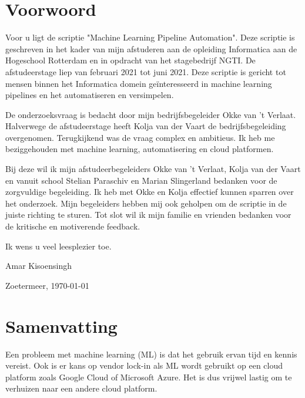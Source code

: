 \titleformat{\chapter}{\vspace{-1in}}{}{}{\Huge\textbf}
\section*{Voorwoord}\thispagestyle{fancy}
Voor u ligt de scriptie "Machine Learning Pipeline Automation". Deze scriptie is geschreven in het kader van mijn afstuderen aan de opleiding Informatica aan de Hogeschool Rotterdam en in opdracht van het stagebedrijf NGTI. De afstudeerstage liep van februari 2021 tot juni 2021. Deze scriptie is gericht tot mensen binnen het Informatica domein geïnteresseerd in machine learning pipelines en het automatiseren en versimpelen.

De onderzoeksvraag is bedacht door mijn bedrijfsbegeleider Okke van 't Verlaat. Halverwege de afstudeerstage heeft Kolja van der Vaart de bedrijfsbegeleiding overgenomen. Terugkijkend was de vraag complex en ambitieus. Ik heb me beziggehouden met machine learning, automatisering en cloud platformen. 

Bij deze wil ik mijn afstudeerbegeleiders Okke van 't Verlaat, Kolja van der Vaart en vanuit school Stelian Paraschiv en Marian Slingerland bedanken voor de zorgvuldige begeleiding. Ik heb met Okke en Kolja effectief kunnen sparren over het onderzoek. Mijn begeleiders hebben mij ook geholpen om de scriptie in de juiste richting te sturen. Tot slot wil ik mijn familie en vrienden bedanken voor de kritische en motiverende feedback.

Ik wens u veel leesplezier toe.

Amar Kisoensingh

Zoetermeer, \today

\newpage

\section*{Samenvatting}
Een probleem met machine learning (ML) is dat het gebruik ervan tijd en kennis vereist. Ook is er kans op vendor lock-in als ML wordt gebruikt op een cloud platform zoals Google Cloud of Microsoft Azure. Het is dus vrijwel lastig om te verhuizen naar een andere cloud platform.

